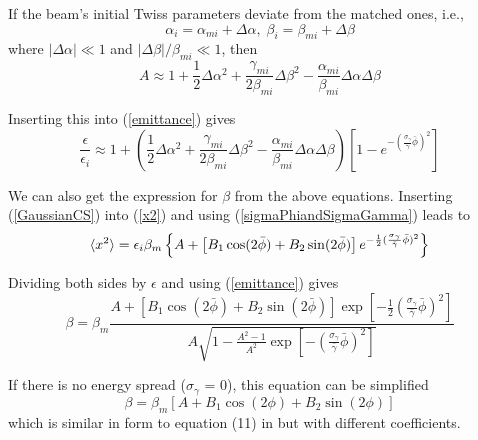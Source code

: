 \documentclass[%
reprint, superscriptaddress,
 amsmath,amssymb, aps,
prstab,
]{revtex4-2}
\begin{document}
If the beam's initial Twiss parameters deviate from the matched ones, i.e.,
\[
\alpha_i  = \alpha_{mi} + \Delta \alpha ,\; \beta_i  = \beta_{mi} + \Delta \beta 
\]
where $|\Delta \alpha | \ll 1$ and $|\Delta \beta| / \beta_{mi} \ll 1$, then
\begin{equation}
A \approx 1 + \frac{1}{2} \Delta \alpha^2 + \frac{\gamma_{mi}}{2\beta_{mi}} \Delta \beta^2 - \frac{\alpha_{mi}}{\beta_{mi}} \Delta \alpha \Delta \beta
\label{deltaA}
\end{equation}

Inserting this into (\ref{emittance}) gives
\[
\frac{\epsilon}{\epsilon_i} \approx 1 +  ( \frac{1}{2} \Delta \alpha^2 + \frac{\gamma_{mi}}{2\beta_{mi}} \Delta \beta^2 - \frac{\alpha_{mi}}{\beta_{mi}} \Delta \alpha \Delta \beta )[1-e^{-(\frac{\sigma_\gamma}{\bar \gamma}\bar \phi)^2}]
\]

We can also get the expression for $\beta$ from the above equations. Inserting (\ref{GaussianCS}) into (\ref{x2}) and using (\ref{sigmaPhiandSigmaGamma}) leads to
\[
\braket{x^2} =\epsilon_i \beta_m \left \{A + \left [B_1 \cos(2\bar \phi) + B_2 \sin(2\bar \phi) \right ] e^{-\frac{1}{2}(\frac{\sigma_\gamma}{\bar \gamma}\bar \phi)^2 } \right \}
\]

Dividing both sides by  $\epsilon$ and using (\ref{emittance}) gives
\begin{equation}
\beta =  \beta_m \frac{A + \left [B_1 \cos(2\bar \phi) + B_2 \sin(2\bar \phi) \right ] \exp [-\frac{1}{2}(\frac{\sigma_\gamma}{\bar \gamma}\bar \phi)^2 ]}{A\sqrt{ 1-\frac{A^2-1}{A^2} \exp[-(\frac{\sigma_\gamma}{\bar \gamma}\bar \phi)^2]}}
\end{equation}

If there is no energy spread ($\sigma_\gamma$ = 0), this equation can be simplified
\begin{equation}
\beta =  \beta_m \left [A + B_1 \cos(2 \phi) + B_2 \sin(2 \phi) \right ] 
\end{equation}
which is similar in form to equation (11) in \cite{Robert} but with different coefficients.
\end{document}
